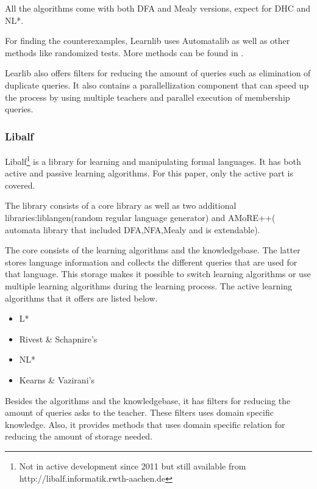\documentclass[multi,crop=false,class=article]{standalone}
\begin{document}
All the algorithms come with both DFA and Mealy versions, expect for DHC and NL*.

For finding the counterexamples, Learnlib uses Automatalib as well as other
methods like randomized tests. More methods can be found in \cite{Isberner2015}.

Learlib also offers filters for reducing the amount of queries such as
elimination of duplicate queries. %
It also contains a parallellization component that can speed up the process by
using multiple teachers and parallel execution of membership
queries\cite{Henrix15}\cite{Howar2012}.

\subsubsection{Libalf}
\label{sssec:libalf}
Libalf\footnote{Not in active development since 2011 but still available
from http://libalf.informatik.rwth-aachen.de} is a library for learning and
manipulating formal languages. It has both active and passive learning
algorithms. For this paper, only the active part is covered.

The library consists of a core library as well as two additional libraries:liblangen(random regular language generator) and AMoRE++(
automata library that included DFA,NFA,Mealy and is extendable).

The core consists of the learning algorithms and the knowledgebase. The latter
stores language information and collects the different queries that are used
for that language. This storage makes it possible to switch learning algorithms
or use multiple learning algorithms during the learning process. The active
learning algorithms that it offers are listed below.

\begin{itemize}
	\item L*
	\item Rivest \& Schapnire's
	\item NL*
	\item Kearns \& Vazirani's
\end{itemize}

Besides the algorithms and the knowledgebase, it has filters for reducing the
amount of queries asks to the teacher. These filters uses domain specific
knowledge. %
Also, it provides methods that uses domain specific relation for reducing the
amount of storage needed.
\end{document}
